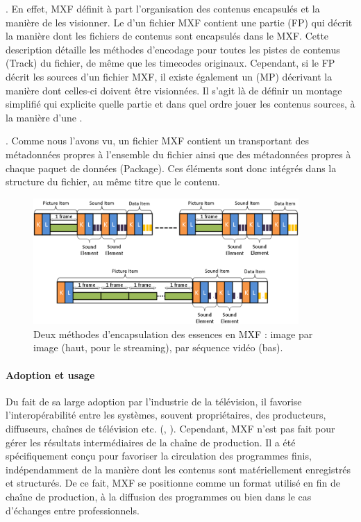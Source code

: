 \begin{liste}
	\item {}. 
	En effet, MXF définit à part l'organisation des contenus encapsulés et la manière de les visionner.
	Le 	d'un fichier MXF contient une partie  (FP) qui décrit la manière dont les fichiers de contenus sont encapsulés dans le MXF. 
	Cette description détaille les méthodes d'encodage pour toutes les pistes de contenus (Track) du fichier, de même que les timecodes originaux.
	Cependant, si le FP décrit les sources d'un fichier MXF, il existe également un  (MP) décrivant la manière dont celles-ci doivent être visionnées.
	Il s'agit là de définir un montage simplifié qui explicite quelle partie et dans quel ordre jouer les contenus sources, à la manière d'une . 

	\item {}. 
	Comme nous l'avons vu, un fichier MXF contient un  transportant des métadonnées propres à l'ensemble du fichier ainsi que des métadonnées propres à chaque paquet de données (Package). 
	Ces éléments sont donc intégrés dans la structure du fichier, au même titre que le contenu.
\end{liste}


\begin{figure}[ht!]
\centering
\includegraphics[width=0.9\textwidth]{images/MXF-ContentPackage.png}
\caption{Deux méthodes d'encapsulation des essences en MXF : image par image (haut, pour le streaming), par séquence vidéo (bas).}
\label{img:mxf-content}
\end{figure}

\paragraph{Adoption et usage}
Du fait de sa large adoption par l'industrie de la télévision, il favorise l'interopérabilité entre les systèmes, souvent propriétaires, des producteurs, diffuseurs, chaînes de télévision etc. (\cite{Ferreira2010}, \cite{Devlin2002}). 
Cependant, MXF n'est pas fait pour gérer les résultats intermédiaires de la chaîne de production. 
Il a été spécifiquement conçu pour favoriser la circulation des programmes finis, indépendamment de la manière dont les contenus sont matériellement enregistrés et structurés.
De ce fait, MXF se positionne comme un format utilisé en fin de chaîne de production, à la diffusion des programmes ou bien dans le cas d'échanges entre professionnels.

